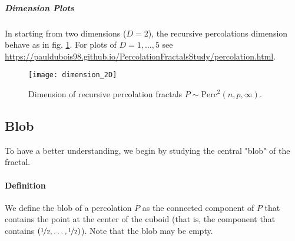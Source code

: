 %

\subparagraph{Dimension Plots}
In starting from two dimensions ($D = 2$), the recursive percolations dimension behave as in fig. \ref{fig:dimension2D}.
For plots of $D = 1,\dots,5$ see \url{https://pauldubois98.github.io/PercolationFractalsStudy/percolation.html}.
\begin{figure}[!h]
	\centering
	\texttt{[image: dimension\_2D]}
	\caption{Dimension of recursive percolation fractals $P \sim \text{Perc}^2(n,p,\infty)$.}
	\label{fig:dimension2D}
\end{figure}

\subsection{Blob}
To have a better understanding, we begin by studying the central "blob" of the fractal.
\paragraph{Definition}
We define the blob of a percolation $P$ as the connected component of $P$ that contains the point at the center of the cuboid (that is, the component that contains $(\nicefrac{1}{2}, \dots, \nicefrac{1}{2})$).
Note that the blob may be empty.

